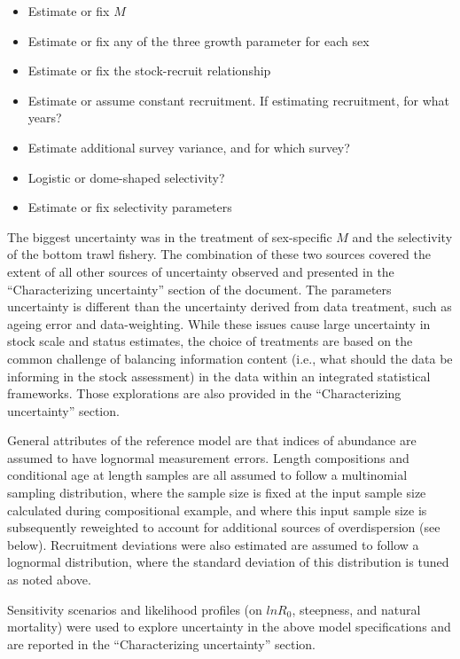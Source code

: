 \documentclass[
]{scrartcl}
\providecommand{\tightlist}{%
  \setlength{\itemsep}{0pt}\setlength{\parskip}{0pt}}\usepackage{longtable,booktabs,array}
\begin{document}
\begin{itemize}
\tightlist
\item
  Estimate or fix \(M\)
\item
  Estimate or fix any of the three growth parameter for each sex
\item
  Estimate or fix the stock-recruit relationship
\item
  Estimate or assume constant recruitment. If estimating recruitment,
  for what years?
\item
  Estimate additional survey variance, and for which survey?
\item
  Logistic or dome-shaped selectivity?
\item
  Estimate or fix selectivity parameters
\end{itemize}

The biggest uncertainty was in the treatment of sex-specific \(M\) and
the selectivity of the bottom trawl fishery. The combination of these
two sources covered the extent of all other sources of uncertainty
observed and presented in the ``Characterizing uncertainty'' section of
the document. The parameters uncertainty is different than the
uncertainty derived from data treatment, such as ageing error and
data-weighting. While these issues cause large uncertainty in stock
scale and status estimates, the choice of treatments are based on the
common challenge of balancing information content (i.e., what should the
data be informing in the stock assessment) in the data within an
integrated statistical frameworks. Those explorations are also provided
in the ``Characterizing uncertainty'' section.

General attributes of the reference model are that indices of abundance
are assumed to have lognormal measurement errors. Length compositions
and conditional age at length samples are all assumed to follow a
multinomial sampling distribution, where the sample size is fixed at the
input sample size calculated during compositional example, and where
this input sample size is subsequently reweighted to account for
additional sources of overdispersion (see below). Recruitment deviations
were also estimated are assumed to follow a lognormal distribution,
where the standard deviation of this distribution is tuned as noted
above.

Sensitivity scenarios and likelihood profiles (on \(lnR_0\), steepness,
and natural mortality) were used to explore uncertainty in the above
model specifications and are reported in the ``Characterizing
uncertainty'' section.
\end{document}
